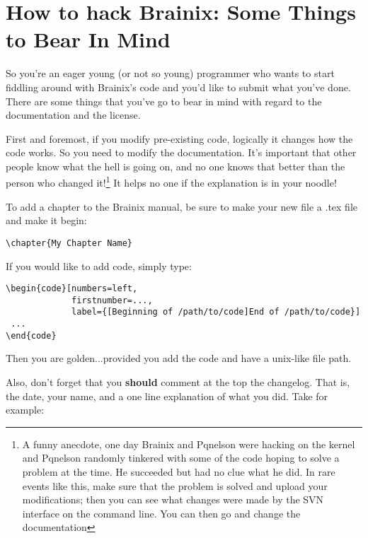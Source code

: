 \chapter{How to hack Brainix: Some Things to Bear In Mind}

So you're an eager young (or not so young) programmer who wants to start fiddling around with Brainix's code and you'd like to submit what you've done. There are some things that you've go to bear in mind with regard to the documentation and the license.

First and foremost, if you modify pre-existing code, logically it changes how the code works. So you need to modify the documentation. It's important that other people know what the hell is going on, and no one knows that better than the person who changed it!\footnote{A funny anecdote, one day Brainix and Pqnelson were hacking on the kernel and Pqnelson randomly tinkered with some of the code hoping to solve a problem at the time. He succeeded but had no clue what he did. In rare events like this, make sure that the problem is solved and upload your modifications; then you can see what changes were made by the SVN interface on the command line. You can then go and change the documentation} It helps no one if the explanation is in your noodle!

To add a chapter to the Brainix manual, be sure to make your new file a .tex file and make it begin:

\begin{Verbatim}
\chapter{My Chapter Name} 
\end{Verbatim}
If you would like to add code, simply type:
\begin{Verbatim}[gobble=-4]
\begin{code}[numbers=left, 
             firstnumber=...,
             label={[Beginning of /path/to/code]End of /path/to/code}]
 ... 
\end{code}
\end{Verbatim}
Then you are golden...provided you add the code and have a unix-like file path.

Also, don't forget that you \textbf{should} comment at the top the changelog. That is, the date, your name, and a one line explanation of what you did. Take for example:

